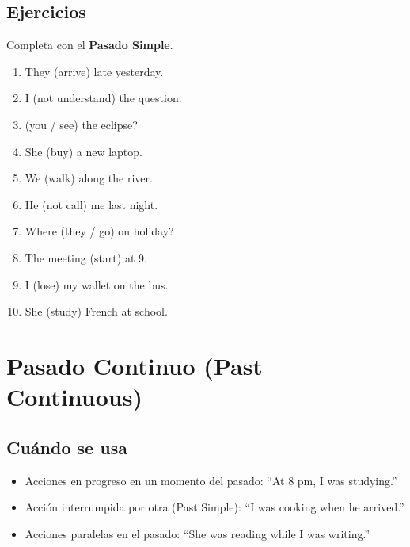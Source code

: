 \documentclass[11pt,a4paper]{article}
\begin{document}
\subsection*{Ejercicios}
Completa con el \textbf{Pasado Simple}.
\begin{enumerate}
  \item They \underline{\hspace{2.5cm}} (arrive) late yesterday.
  \item I \underline{\hspace{2.5cm}} (not understand) the question.
  \item \underline{\hspace{2.5cm}} (you / see) the eclipse?
  \item She \underline{\hspace{2.5cm}} (buy) a new laptop.
  \item We \underline{\hspace{2.5cm}} (walk) along the river.
  \item He \underline{\hspace{2.5cm}} (not call) me last night.
  \item Where \underline{\hspace{2.5cm}} (they / go) on holiday?
  \item The meeting \underline{\hspace{2.5cm}} (start) at 9.
  \item I \underline{\hspace{2.5cm}} (lose) my wallet on the bus.
  \item She \underline{\hspace{2.5cm}} (study) French at school.
\end{enumerate}

\section{Pasado Continuo (Past Continuous)}
\subsection*{Cuándo se usa}
\begin{itemize}
  \item Acciones en progreso en un momento del pasado: ``At 8 pm, I was studying.''
  \item Acción interrumpida por otra (Past Simple): ``I was cooking when he arrived.''
  \item Acciones paralelas en el pasado: ``She was reading while I was writing.''
\end{itemize}
\end{document}
